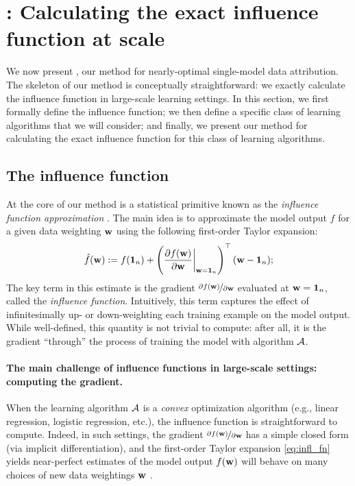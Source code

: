 \section{\method{}: Calculating the exact influence function at scale} We now
present \method{}, our method for nearly-optimal single-model data attribution.
The skeleton of our method is conceptually straightforward: we exactly calculate
the influence function in large-scale learning settings.
In this section, we first formally define the influence function;
we then define a specific class of learning algorithms that we will consider;
and finally, we present our method for calculating the exact influence function
for this class of learning algorithms.

\subsection{The influence function} %
\label{sec:influence_fn}
At the core of our method is a statistical primitive
known as the {\em influence function approximation}
\citep{hampel1947influence,koh2017understanding,giordano2019swiss}.
The main idea is to approximate the model output $f$ for a given
data weighting
$\mathbf{w}$ using the following first-order Taylor expansion:
\begin{equation}
  \label{eq:infl_fn}
  \hat{f}(\mathbf{w}) := f(\mathbf{1}_n) +
  \left(\frac{\partial f(\mathbf{w})}{\partial
  \mathbf{w}}\bigg|_{\mathbf{w}=\mathbf{1}_n}\right)^\top  (\mathbf{w} -
  \mathbf{1}_n);
\end{equation}
The key term in this estimate is the gradient
$\nicefrac{\partial f(\mathbf{w})}{\partial \mathbf{w}}$ evaluated at
$\mathbf{w}=\mathbf{1}_n$, called the \textit{influence function}.
Intuitively, this term captures the effect of infinitesimally up- or
down-weighting each training example on the model output.
While well-defined, this quantity is not trivial to compute:
after all, it is the gradient ``through'' the process of training
the model with algorithm $\mathcal{A}{}$.



\paragraph{The main challenge of influence functions in large-scale settings:
computing the gradient.} When the learning algorithm $\mathcal{A}{}$ is a {\em convex}
optimization algorithm (e.g., linear regression, logistic regression, etc.),
the influence function is straightforward to compute. Indeed, in such settings,
the gradient $\nicefrac{\partial f(\mathbf{w})}{\partial \mathbf{w}}$ has a simple closed
form (via implicit differentiation),
and the first-order Taylor expansion \eqref{eq:infl_fn} yields
near-perfect estimates of the model output $f(\mathbf{w})$ will behave on many
choices of new data weightings $\mathbf{w}$
\citep{koh2017understanding,rad2018scalable,koh2019accuracy,giordano2019swiss}.

